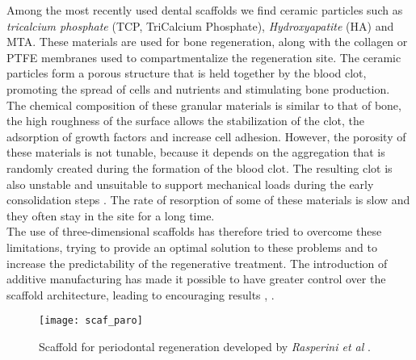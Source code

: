Among the most recently used dental scaffolds we find ceramic particles such as \emph{tricalcium phosphate} (TCP, TriCalcium Phosphate), \emph{Hydroxyapatite} (HA) and MTA. These materials are used for bone regeneration, along with the collagen or PTFE membranes used to compartmentalize the regeneration site. The ceramic particles form a porous structure that is held together by the blood clot, promoting the spread of cells and nutrients and stimulating bone production. \\ The chemical composition of these granular materials is similar to that of bone, the high roughness of the surface allows the stabilization of the clot, the adsorption of growth factors and increase cell adhesion. However, the porosity of these materials is not tunable, because it depends on the aggregation that is randomly created during the formation of the blood clot. The resulting clot is also unstable and unsuitable to support mechanical loads during the early consolidation steps \parencite{Reference131}. The rate of resorption of some of these materials is slow and they often stay in the site for a long time. \\
The use of three-dimensional scaffolds has therefore tried to overcome these limitations, trying to provide an optimal solution to these problems and to increase the predictability of the regenerative treatment. The introduction of additive manufacturing has made it possible to have greater control over the scaffold architecture, leading to encouraging results \parencite{Reference136}, \parencite{Reference137}.\\

\begin{figure}[h]
\vspace{-10pt}
	\begin{center}
	\texttt{[image: scaf\_paro]}
    \caption{Scaffold for periodontal regeneration developed by \emph{Rasperini et al} \parencite{Reference134}.}
    \label{fig:scaf_paro}
	\end{center}
\vspace{-20pt}
\end{figure}

